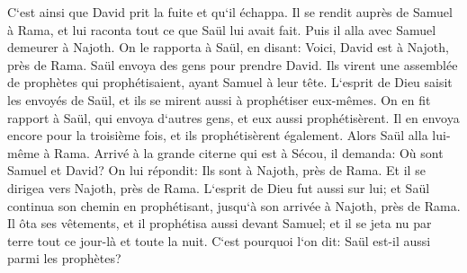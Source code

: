 \verse C`est ainsi que David prit la fuite et qu`il échappa. Il se rendit auprès de Samuel à Rama, et lui raconta tout ce que Saül lui avait fait. Puis il alla avec Samuel demeurer à Najoth. 
\verse On le rapporta à Saül, en disant: Voici, David est à Najoth, près de Rama. 
\verse Saül envoya des gens pour prendre David. Ils virent une assemblée de prophètes qui prophétisaient, ayant Samuel à leur tête. L`esprit de Dieu saisit les envoyés de Saül, et ils se mirent aussi à prophétiser eux-mêmes. 
\verse On en fit rapport à Saül, qui envoya d`autres gens, et eux aussi prophétisèrent. Il en envoya encore pour la troisième fois, et ils prophétisèrent également. 
\verse Alors Saül alla lui-même à Rama. Arrivé à la grande citerne qui est à Sécou, il demanda: Où sont Samuel et David? On lui répondit: Ils sont à Najoth, près de Rama. 
\verse Et il se dirigea vers Najoth, près de Rama. L`esprit de Dieu fut aussi sur lui; et Saül continua son chemin en prophétisant, jusqu`à son arrivée à Najoth, près de Rama. 
\verse Il ôta ses vêtements, et il prophétisa aussi devant Samuel; et il se jeta nu par terre tout ce jour-là et toute la nuit. C`est pourquoi l`on dit: Saül est-il aussi parmi les prophètes? 

